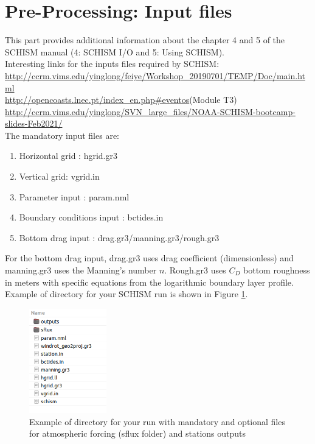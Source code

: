 \documentclass[preprints,briefreport,accept,oneauthor,pdftex]{Definitions/mdpi}
\begin{document}
\section{Pre-Processing: Input files}
\noindent This part provides additional information about the chapter 4 and 5 of the  SCHISM manual (4: SCHISM I/O and 5: Using SCHISM).\\
Interesting links for the inputs files required by SCHISM:\\
\url{http://ccrm.vims.edu/yinglong/feiye/Workshop_20190701/TEMP/Doc/main.html}\\
\url{http://opencoasts.lnec.pt/index_en.php#eventos}(Module T3) \\
\url{http://ccrm.vims.edu/yinglong/SVN_large_files/NOAA-SCHISM-bootcamp-slides-Feb2021/}\\
\noindent The mandatory input files are:
\begin{enumerate}
    \item Horizontal grid : hgrid.gr3
    \item Vertical grid: vgrid.in
    \item Parameter input : param.nml
    \item Boundary conditions input : bctides.in
    \item Bottom drag input : drag.gr3/manning.gr3/rough.gr3
\end{enumerate}
For the bottom drag input, drag.gr3 uses drag coefficient (dimensionless) and manning.gr3 uses the Manning's number $n$. Rough.gr3 uses $C_D$ bottom roughness in meters with specific equations from the logarithmic boundary layer profile. \\
Example of directory for your SCHISM run is shown in Figure \ref{fig:run}.
\begin{figure}[htbp]
    \centering
    \includegraphics[width=0.3\textwidth]{figures/config.png}
    \caption{Example of directory for your run with mandatory and optional files for atmospheric forcing (sflux folder) and stations outputs}
    \label{fig:run}
\end{figure}
\end{document}
